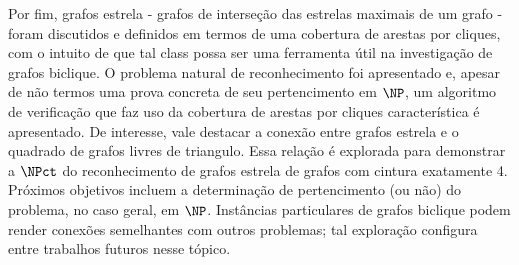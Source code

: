 Por fim, grafos estrela - grafos de interseção das estrelas maximais de um grafo - foram discutidos e definidos em termos de uma cobertura de arestas por cliques, com o intuito de que tal class possa ser uma ferramenta útil na investigação de grafos biclique.
O problema natural de reconhecimento foi apresentado e, apesar de não termos uma prova concreta de seu pertencimento em $\NP$, um algoritmo de verificação que faz uso da cobertura de arestas por cliques característica é apresentado.
De interesse, vale destacar a conexão entre grafos estrela e o quadrado de grafos livres de triangulo.
Essa relação é explorada para demonstrar a $\NPct$ do reconhecimento de grafos estrela de grafos com cintura exatamente 4.
Próximos objetivos incluem a determinação de pertencimento (ou não) do problema, no caso geral, em $\NP$.
Instâncias particulares de grafos biclique podem render conexões semelhantes com outros problemas; tal exploração configura entre trabalhos futuros nesse tópico.
